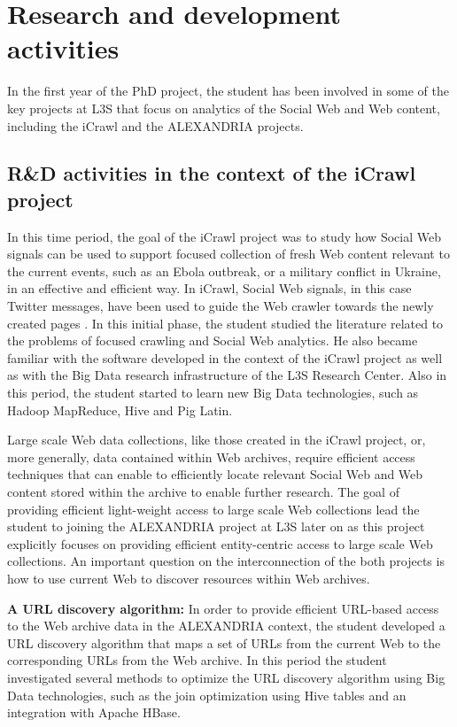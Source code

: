 \documentclass[a4paper,11pt]{report}
\begin{document}
\section{Research and development activities}

In the first year of the PhD project, the student has been involved in some of the key projects
at L3S that focus on analytics of the Social Web and Web content,  
including the iCrawl and the ALEXANDRIA projects. 

\subsection{R\&D activities in the context of the iCrawl project}
In this time period, the goal of the iCrawl project was to study how 
Social Web signals can be used to support focused collection of fresh Web content 
relevant to the current events, such as an Ebola outbreak, or a military conflict in Ukraine, 
in an effective and efficient way. In iCrawl, Social Web signals, in this case Twitter messages,
have been used to guide the Web crawler towards the newly created pages \cite{gossen15}.
%
In this initial phase, the student studied the literature related to the 
problems of focused crawling and Social Web analytics.
He also became familiar with the software developed in the context of the iCrawl project as well as 
with the Big Data research infrastructure of the L3S Research Center. 
Also in this period, the student started to learn new Big Data technologies, 
such as Hadoop MapReduce, Hive and Pig Latin. 

Large scale Web data collections, like those created in the iCrawl project, 
or, more generally, data contained within Web archives, require efficient access techniques
that can enable to efficiently locate relevant Social Web and Web content stored  
within the archive to enable further research. 
%
The goal of providing efficient light-weight access to large scale Web collections
lead the student to joining the ALEXANDRIA project at L3S later on as this project 
explicitly focuses on providing efficient entity-centric access to large scale 
Web collections. 
% 
An important question on the interconnection of the both projects
is how to use current Web to discover resources within Web archives.

\textbf{A URL discovery algorithm:} 
In order to provide efficient URL-based access to the Web archive data in the ALEXANDRIA 
context, the student developed a URL discovery algorithm that
maps a set of URLs from the current Web to the corresponding URLs from the Web archive. 
In this period the student investigated several methods to optimize the URL discovery 
algorithm using Big Data technologies, such as the join optimization using Hive tables and an integration with Apache HBase.
\end{document}
